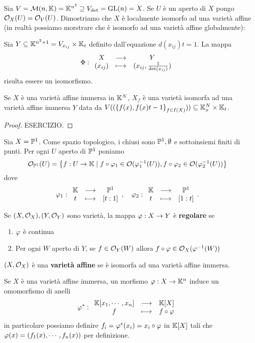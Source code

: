 \begin{example}
Sia $V=\mathcal{M}(n,\mathbb{K})= \mathbb{K}^{n^2}\supseteq V_{\det}=\mathrm{GL}(n)=X$. Se $U$ \`e un aperto di $X$ pongo $\mathcal{O}_X(U)=\mathcal{O}_V(U)$. Dimostriamo che $X$ \`e localmente isomorfo ad una variet\`a affine (in realt\`a possiamo morstrare che \`e isomorfo ad una variet\`a affine globalmente):

Sia $Y\subseteq \mathbb{K}^{n^2+1}=V_{x_{ij}}\times \mathbb{K}_{t}$ definito dall'equazione $d(x_{ij})t=1$. La mappa
\[\Phi:\begin{array}{ccc} {X} & \longrightarrow & {Y}\\ {(x_{ij})} & \longmapsto & {(x_{ij},\frac1{\det(x_{ij})})} \end{array}\]
risulta essere un isomorfismo.
\end{example}

\begin{proposition}
Se $X$ \`e una variet\`a affine immersa in $\mathbb{K}^N$, $X_f$ \`e una variet\`a isomorfa ad una variet\`a affine immersa $Y$ data da $V((\left\{{f(x),f(x)t-1}\right\}_{f\in I(X)}))\subseteq \mathbb{K}^N_x\times \mathbb{K}_t$.
\end{proposition}
\begin{proof}
ESERCIZIO.
\end{proof}

\begin{example}
Sia $X=\mathbb{P}^1$. Come spazio topologico, i chiusi sono $\mathbb{P}^1,\emptyset$ e sottoinsiemi finiti di punti. Per ogni $U$ aperto di $\mathbb{P}^1$ poniamo
\[\mathcal{O}_{\mathbb{P}^1}(U)=\left\{{f:U\to \mathbb{K}\mid f\circ \varphi_1\in\mathcal{O}(\varphi_1^{-1}(U)),f\circ \varphi_2\in\mathcal{O}(\varphi_2^{-1}(U))}\right\}\]
dove
\[\varphi_1:\begin{array}{ccc} {\mathbb{K}} & \longrightarrow & {\mathbb{P}^1}\\ {t} & \longmapsto & {[t:1]} \end{array},\quad \varphi_2:\begin{array}{ccc} {\mathbb{K}} & \longrightarrow & {\mathbb{P}^1}\\ {t} & \longmapsto & {[1:t]} \end{array}.\]
\end{example}

\begin{definition}
Se $(X,\mathcal{O}_X),(Y,\mathcal{O}_Y)$ sono variet\`a, la mappa $\varphi:X\to Y$ \`e \textbf{regolare} se
\begin{enumerate}
	\item $\varphi$ \`e continua
	\item Per ogni $W$ aperto di $Y$, se $f\in\mathcal{O}_Y(W)$ allora $f\circ \varphi\in \mathcal{O}_X(\varphi^{-1}(W))$
\end{enumerate}
\end{definition}

\begin{definition}
$(X,\mathcal{O}_X)$ \`e una \textbf{variet\`a affine} se \`e isomorfa ad una variet\`a affine immersa.
\end{definition}

Se $X$ \`e una variet\`a affine immersa, un morfismo $\varphi:X\to \mathbb{K}^n$ induce un omomorfismo di anelli
\[\varphi^\ast:\begin{array}{ccc} {\mathbb{K}[x_1,\cdots, x_n]} & \longrightarrow & {\mathbb{K}[X]}\\ {f} & \longmapsto & {f\circ \varphi} \end{array}\]
in particolare possiamo definire $f_i=\varphi^\ast(x_i)=x_i\circ \varphi$ in $\mathbb{K}[X]$ tali che $\varphi(x)=(f_1(x),\cdots,f_n(x))$ per definizione.

